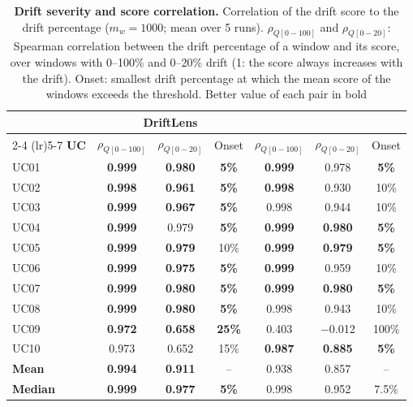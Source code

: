 \begin{table}[t!]
\centering
\caption{\textbf{Drift severity and score correlation.} Correlation of the drift score to the drift percentage ($m_w=1000$; mean over 5 runs). $\rho_{Q[0-100]}$ and $\rho_{Q[0-20]}$: Spearman correlation between the drift percentage of a window and its score, over windows with 0--100\% and 0--20\% drift (1: the score always increases with the drift). Onset: smallest drift percentage at which the mean score of the windows exceeds the threshold. Better value of each pair in bold}
\label{tab:drift_sweep}
\footnotesize
\setlength{\tabcolsep}{3pt}
\begin{tabular}{lcccccc}
\toprule
 & \multicolumn{3}{c}{\textbf{DriftLens}} & \multicolumn{3}{c}{\textbf{\method{}}} \\
\cmidrule(lr){2-4} \cmidrule(lr){5-7}
\textbf{UC} & $\rho_{Q[0-100]}$ & $\rho_{Q[0-20]}$ & Onset & $\rho_{Q[0-100]}$ & $\rho_{Q[0-20]}$ & Onset \\
\midrule
UC01 & \textbf{0.999} & \textbf{0.980} & \textbf{5\%} & \textbf{0.999} & 0.978 & \textbf{5\%} \\
UC02 & \textbf{0.998} & \textbf{0.961} & \textbf{5\%} & \textbf{0.998} & 0.930 & 10\% \\
UC03 & \textbf{0.999} & \textbf{0.967} & \textbf{5\%} & 0.998 & 0.944 & 10\% \\
UC04 & \textbf{0.999} & 0.979 & \textbf{5\%} & \textbf{0.999} & \textbf{0.980} & \textbf{5\%} \\
UC05 & \textbf{0.999} & \textbf{0.979} & 10\% & \textbf{0.999} & \textbf{0.979} & \textbf{5\%} \\
UC06 & \textbf{0.999} & \textbf{0.975} & \textbf{5\%} & \textbf{0.999} & 0.959 & 10\% \\
UC07 & \textbf{0.999} & \textbf{0.980} & \textbf{5\%} & \textbf{0.999} & \textbf{0.980} & \textbf{5\%} \\
UC08 & \textbf{0.999} & \textbf{0.980} & \textbf{5\%} & 0.998 & 0.943 & 10\% \\
UC09 & \textbf{0.972} & \textbf{0.658} & \textbf{25\%} & 0.403 & $-$0.012 & 100\% \\
UC10 & 0.973 & 0.652 & 15\% & \textbf{0.987} & \textbf{0.885} & \textbf{5\%} \\
\midrule
\textbf{Mean} & \textbf{0.994} & \textbf{0.911} & -- & 0.938 & 0.857 & -- \\
\textbf{Median} & \textbf{0.999} & \textbf{0.977} & \textbf{5\%} & 0.998 & 0.952 & 7.5\% \\
\bottomrule
\end{tabular}
\end{table}
